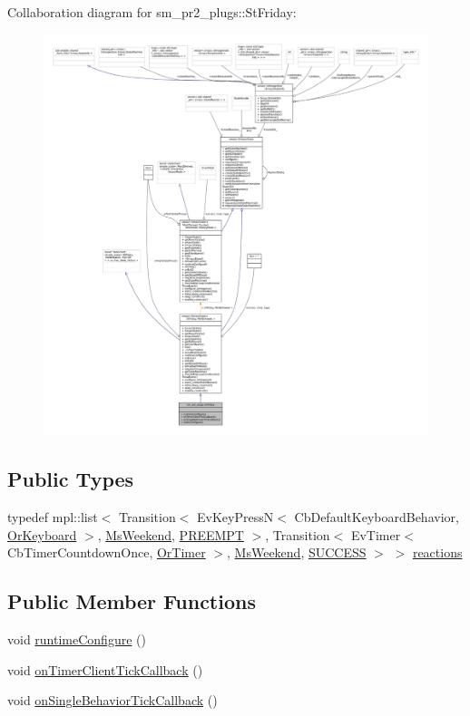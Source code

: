 Collaboration diagram for sm\+\_\+pr2\+\_\+plugs\+:\+:St\+Friday\+:
\nopagebreak
\begin{figure}[H]
\begin{center}
\leavevmode
\includegraphics[width=350pt]{structsm__pr2__plugs_1_1StFriday__coll__graph}
\end{center}
\end{figure}
\subsection*{Public Types}
\begin{DoxyCompactItemize}
\item 
typedef mpl\+::list$<$ Transition$<$ Ev\+Key\+PressN$<$ Cb\+Default\+Keyboard\+Behavior, \hyperlink{classsm__pr2__plugs_1_1OrKeyboard}{Or\+Keyboard} $>$, \hyperlink{classsm__pr2__plugs_1_1MsWeekend}{Ms\+Weekend}, \hyperlink{classPREEMPT}{P\+R\+E\+E\+M\+PT} $>$, Transition$<$ Ev\+Timer$<$ Cb\+Timer\+Countdown\+Once, \hyperlink{classsm__pr2__plugs_1_1OrTimer}{Or\+Timer} $>$, \hyperlink{classsm__pr2__plugs_1_1MsWeekend}{Ms\+Weekend}, \hyperlink{classSUCCESS}{S\+U\+C\+C\+E\+SS} $>$ $>$ \hyperlink{structsm__pr2__plugs_1_1StFriday_af7a1171c70541cd3d401c5885ef1a49e}{reactions}
\end{DoxyCompactItemize}
\subsection*{Public Member Functions}
\begin{DoxyCompactItemize}
\item 
void \hyperlink{structsm__pr2__plugs_1_1StFriday_ace2f3d91818bf98d04de789df2d3cb16}{runtime\+Configure} ()
\item 
void \hyperlink{structsm__pr2__plugs_1_1StFriday_a3a68bc9b1ab9c0f4d9325bc56171f9b0}{on\+Timer\+Client\+Tick\+Callback} ()
\item 
void \hyperlink{structsm__pr2__plugs_1_1StFriday_a830869c4ad011a1cab0bb87bb0dc3d37}{on\+Single\+Behavior\+Tick\+Callback} ()
\end{DoxyCompactItemize}
